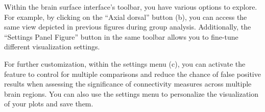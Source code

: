 \documentclass[justified]{tufte-handout}
\begin{document}
Within the brain surface interface's toolbar, you have various options to explore. For example, by clicking on the “Axial dorsal” button (b), you can access the same view depicted in previous figures during group analysis. Additionally, the “Settings Panel Figure” button in the same toolbar allows you to fine-tune different visualization settings.

For further customization, within the settings menu (c), you can activate the  feature to control for multiple comparisons and reduce the chance of false positive results when assessing the significance of connectivity measures across multiple brain regions. You can also use the settings menu to personalize the visualization of your plots and save them.
\end{document}

